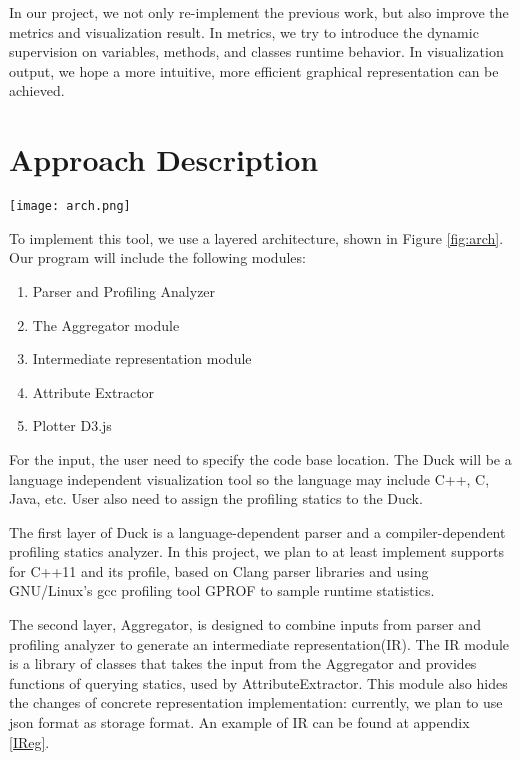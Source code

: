 \documentclass{sig-alternate}
\begin{document}
In our project, we not only re-implement the previous work, but also improve the metrics and visualization result.
In metrics, we try to introduce the dynamic supervision on variables, methods, and classes runtime behavior.
In visualization output, we hope a more intuitive, more efficient graphical representation can be achieved.

\section{Approach Description}

\begin{figure*}
\centering
\texttt{[image: arch.png]}
\caption{Architecture of Duck}
\label{fig:arch}
\end{figure*}

To implement this tool, we use a layered architecture, shown in Figure \ref{fig:arch}. Our program will include the following modules:

\begin{enumerate}
\item Parser and Profiling Analyzer
\item The Aggregator module 
\item Intermediate representation module
\item Attribute Extractor
\item Plotter D3.js
\end{enumerate}

For the input, the user need to specify the code base location.
The Duck will be a language independent visualization tool so the language may include C++, C, Java, etc.
User also need to assign the profiling statics to the Duck.

The first layer of Duck is a language-dependent parser and a compiler-dependent profiling statics analyzer.
In this project, we plan to at least implement supports for C++11 and its profile,
based on Clang parser libraries and using GNU/Linux’s gcc profiling tool GPROF to sample runtime statistics.

The second layer, Aggregator, is designed to combine inputs from parser and profiling
analyzer to generate an intermediate representation(IR). The IR module is a library of
classes that takes the input from the Aggregator and provides functions of querying statics,
used by AttributeExtractor. This module also hides the changes of concrete representation implementation: currently,
we plan to use json format as storage format. An example of IR can be found at appendix \ref{IReg}. 
\end{document}
